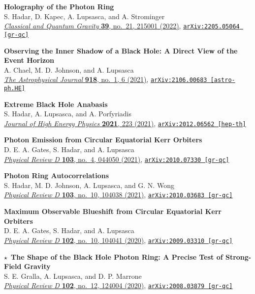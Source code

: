 \documentclass[margin,line]{resume}
\begin{document}
\begin{resume}
\textbf{Holography of the Photon Ring} \\
S. Hadar, D. Kapec, A. Lupsasca, and A. Strominger \\
\href{https://doi.org/10.1088/1361-6382/ac8d43}{\textit{Classical and Quantum Gravity} \textbf{39}, no.~21, 215001 (2022)}, \texttt{\href{https://arxiv.org/abs/2205.05064}{arXiv:2205.05064 [gr-qc]}}

\textbf{Observing the Inner Shadow of a Black Hole: A Direct View of the Event Horizon} \\
A. Chael, M. D. Johnson, and A. Lupsasca \\
\href{https://doi.org/10.3847/1538-4357/ac09ee}{\textit{The Astrophysical Journal} \textbf{918}, no.~1, 6 (2021)}, \texttt{\href{https://arxiv.org/abs/2106.00683}{arXiv:2106.00683 [astro-ph.HE]}}

\textbf{Extreme Black Hole Anabasis} \\
S. Hadar, A. Lupsasca, and A. Porfyriadis \\
\href{https://doi.org/10.1007/JHEP03(2021)223}{\textit{Journal of High Energy Physics} \textbf{2021}, 223 (2021)}, \texttt{\href{https://arxiv.org/abs/2012.06562}{arXiv:2012.06562 [hep-th]}}

\textbf{Photon Emission from Circular Equatorial Kerr Orbiters} \\
D. E. A. Gates, S. Hadar, and A. Lupsasca \\
\href{https://doi.org/10.1103/PhysRevD.103.044050}{\textit{Physical Review D} \textbf{103}, no.~4, 044050 (2021)}, \texttt{\href{https://arxiv.org/abs/2010.07330}{arXiv:2010.07330 [gr-qc]}}

\textbf{Photon Ring Autocorrelations} \\
S. Hadar, M. D. Johnson, A. Lupsasca, and G. N. Wong \\
\href{https://doi.org/10.1103/PhysRevD.103.104038}{\textit{Physical Review D} \textbf{103}, no.~10, 104038 (2021)}, \texttt{\href{https://arxiv.org/abs/2010.03683}{arXiv:2010.03683 [gr-qc]}}

\textbf{Maximum Observable Blueshift from Circular Equatorial Kerr Orbiters} \\
D. E. A. Gates, S. Hadar, and A. Lupsasca \\
\href{https://doi.org/10.1103/PhysRevD.102.104041}{\textit{Physical Review D} \textbf{102}, no.~10, 104041 (2020)}, \texttt{\href{https://arxiv.org/abs/2009.03310}{arXiv:2009.03310 [gr-qc]}}

\hspace{-9pt}$\star$\ \textbf{The Shape of the Black Hole Photon Ring: A Precise Test of Strong-Field Gravity} \\
S. E. Gralla, A. Lupsasca, and D. P. Marrone \\
\href{https://doi.org/10.1103/PhysRevD.102.124004}{\textit{Physical Review D} \textbf{102}, no.~12, 124004 (2020)}, \texttt{\href{https://arxiv.org/abs/2008.03879}{arXiv:2008.03879 [gr-qc]}}


\end{resume}
\end{document}
